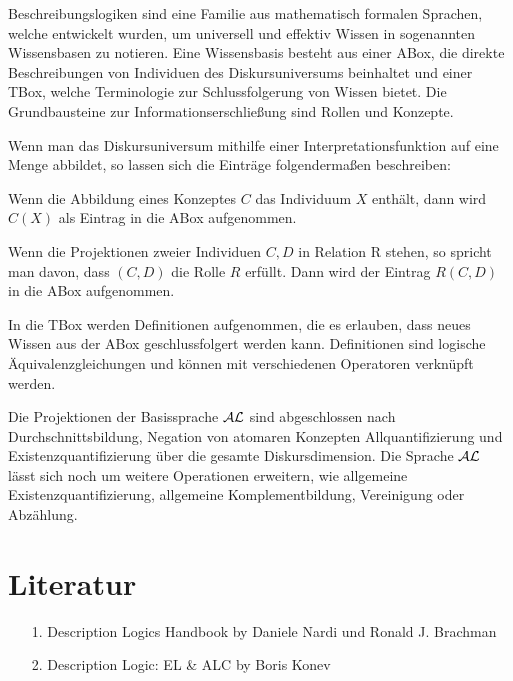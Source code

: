 \documentclass[runningheads,a4paper]{llncs}
\begin{document}
Beschreibungslogiken sind eine Familie aus mathematisch formalen Sprachen, welche entwickelt wurden, um universell und effektiv Wissen in sogenannten Wissensbasen zu notieren. Eine Wissensbasis  besteht aus einer ABox, die direkte Beschreibungen von Individuen des Diskursuniversums beinhaltet und einer TBox, welche Terminologie zur Schlussfolgerung von Wissen bietet. Die Grundbausteine zur Informationserschließung sind Rollen und Konzepte.

Wenn man das Diskursuniversum mithilfe einer Interpretationsfunktion auf eine Menge abbildet, so lassen sich die Einträge folgendermaßen beschreiben:

Wenn die Abbildung eines Konzeptes $C$ das Individuum $X$ enthält, dann wird $C(X)$ als Eintrag in die ABox aufgenommen. 

Wenn die Projektionen zweier Individuen $C,D$ in Relation R stehen, so spricht man davon, dass $(C,D)$ die Rolle $R$ erfüllt. Dann wird der Eintrag $R(C,D)$ in die ABox aufgenommen.

In die TBox werden Definitionen aufgenommen, die es erlauben, dass neues Wissen aus der ABox geschlussfolgert werden kann. Definitionen sind logische Äquivalenzgleichungen und können mit verschiedenen Operatoren verknüpft werden.

 Die Projektionen der Basissprache $\cal AL$ sind abgeschlossen nach Durchschnittsbildung, Negation von atomaren Konzepten Allquantifizierung und Existenzquantifizierung über die gesamte Diskursdimension. Die Sprache $\cal AL$ lässt sich noch um weitere Operationen erweitern, wie allgemeine Existenzquantifizierung, allgemeine Komplementbildung, Vereinigung oder Abzählung.



\section{Literatur}
		\begin{itemize}
		\item[1.] Description Logics Handbook by Daniele Nardi und Ronald J. Brachman
		\item[2.] Description Logic: EL \& ALC by Boris Konev
		\end{itemize}
\end{document}

